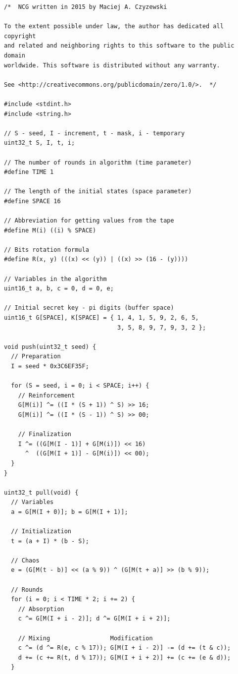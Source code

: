 \documentclass[twocolumn, a4paper, 10pt]{article}
\begin{document}
\begin{lstlisting}[style=codeAppendix]
/*  NCG written in 2015 by Maciej A. Czyzewski

To the extent possible under law, the author has dedicated all copyright
and related and neighboring rights to this software to the public domain
worldwide. This software is distributed without any warranty.

See <http://creativecommons.org/publicdomain/zero/1.0/>.  */

#include <stdint.h>
#include <string.h>

// S - seed, I - increment, t - mask, i - temporary
uint32_t S, I, t, i;

// The number of rounds in algorithm (time parameter)
#define TIME 1

// The length of the initial states (space parameter)
#define SPACE 16

// Abbreviation for getting values from the tape
#define M(i) ((i) % SPACE)

// Bits rotation formula
#define R(x, y) (((x) << (y)) | ((x) >> (16 - (y))))

// Variables in the algorithm
uint16_t a, b, c = 0, d = 0, e;

// Initial secret key - pi digits (buffer space)
uint16_t G[SPACE], K[SPACE] = { 1, 4, 1, 5, 9, 2, 6, 5,
                                3, 5, 8, 9, 7, 9, 3, 2 };

void push(uint32_t seed) {
  // Preparation
  I = seed * 0x3C6EF35F;

  for (S = seed, i = 0; i < SPACE; i++) {
    // Reinforcement
    G[M(i)] ^= ((I * (S + 1)) ^ S) >> 16;
    G[M(i)] ^= ((I * (S - 1)) ^ S) >> 00;

    // Finalization
    I ^= ((G[M(I - 1)] + G[M(i)]) << 16)
      ^  ((G[M(I + 1)] - G[M(i)]) << 00);
  }
}

uint32_t pull(void) {
  // Variables
  a = G[M(I + 0)]; b = G[M(I + 1)];

  // Initialization
  t = (a + I) * (b - S);

  // Chaos
  e = (G[M(t - b)] << (a % 9)) ^ (G[M(t + a)] >> (b % 9));

  // Rounds
  for (i = 0; i < TIME * 2; i += 2) {
    // Absorption
    c ^= G[M(I + i - 2)]; d ^= G[M(I + i + 2)];

    // Mixing                 Modification
    c ^= (d ^= R(e, c % 17)); G[M(I + i - 2)] -= (d += (t & c));
    d += (c += R(t, d % 17)); G[M(I + i + 2)] += (c += (e & d));
  }


\end{lstlisting}
\end{document}

